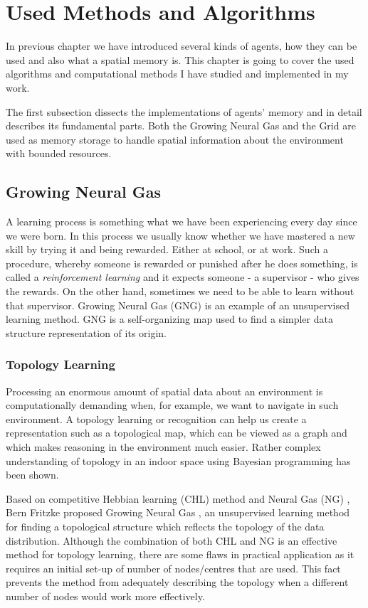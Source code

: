 \chapter{Used Methods and Algorithms}

In previous chapter we have introduced several kinds of agents, how they can be used and also what a spatial memory is. This chapter is going to cover the used algorithms and computational methods I have studied and implemented in my work. 

The first subsection dissects the implementations of agents' memory and in detail describes its fundamental parts. Both the Growing Neural Gas and the Grid are used as memory storage to handle spatial information about the environment with bounded resources.

\section{Growing Neural Gas}   
\label{usedalgo:gng}

A learning process is something what we have been experiencing every day since we were born. In this process we usually know whether we have mastered a new skill by trying it and being rewarded. Either at school, or at work. Such a procedure, whereby someone is rewarded or punished after he does something, is called a \emph{reinforcement learning} and it expects someone - a supervisor - who gives the rewards. On the other hand, sometimes we need to be able to learn without that supervisor. Growing Neural Gas (GNG) is an example of an unsupervised learning method. GNG is a self-organizing map used to find a simpler data structure representation of its origin.

\subsection{Topology Learning}

Processing an enormous amount of spatial data about an environment is computationally demanding when, for example, we want to navigate in such environment. A topology learning or recognition can help us create a representation such as a topological map, which can be viewed as a graph and which makes reasoning in the environment much easier. Rather complex understanding of topology in an indoor space using Bayesian programming has been shown. \cite{Tapus:topologylearning}  

Based on competitive Hebbian learning (CHL) method \cite{Martinetz:chl} and Neural Gas (NG) \cite{Martinetz:ng}, Bern Fritzke proposed Growing Neural Gas \cite{Fritzke:gng}, an unsupervised learning method for finding a topological structure which reflects the topology of the data distribution. Although the combination of both CHL and NG is an effective method for topology learning, there are some flaws in practical application as it requires an initial set-up of number of nodes/centres that are used. This fact prevents the method from adequately describing the topology when a different number of nodes would work more effectively.


